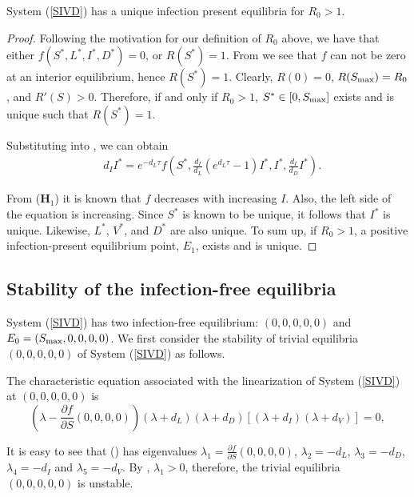 \documentclass{CMHPhD-SIVD}
\begin{document}
\begin{lemma}
	System (\ref{SIVD}) has a unique infection present equilibria for $R_0>1$.
\end{lemma}
\begin{proof}
Following the motivation for our definition of $R_0$ above, we have that
either $f(S^*, L^*, I^*, D^*)=0$, or $R(S^*)=1$.
From  we see that $f$ can not be zero at an interior equilibrium, hence
$R(S^*)=1$. 
Clearly, $R(0)=0$, $R(S_{\text{max}})=R_0$, and $R'(S)>0$. Therefore, if and only if $R_0>1$, $S^*\in[0, S_{\text{max}}]$ exists and is unique such that $R(S^*)=1$. 

Substituting  into , we can obtain
\begin{align*}
&d_I I^*=e^{-d_L\tau}f(S^*, \frac{d_I}{d_L}(e^{d_L\tau}-1)I^*, I^*, \frac{d_I}{d_D}I^*).
\end{align*}

From ($\mathbf{H}_1$) it is known that $f$ decreases with increasing $I$. Also, the left side of the equation is increasing. Since $S^*$ is known to be unique, it follows that $I^*$ is unique. Likewise, $L^*$, $V^*$, and $D^*$ are also unique. To sum up, if $R_0>1$, a positive infection-present equilibrium point, $E_1$, exists and is unique.
\end{proof}



\subsection{Stability of the infection-free equilibria}\label{sec3.2}
System (\ref{SIVD}) has two infection-free equilibrium: $(0,0,0,0,0)$ and $E_0=(S_{\text{max}},0,0,0,0)$.
We first consider the stability of trivial equilibria $(0,0,0,0,0)$ of System (\ref{SIVD}) as follows.

The characteristic equation associated with the linearization of System (\ref{SIVD}) at $(0, 0, 0,0, 0)$ is
\begin{equation}\label{c0}
    \left(\lambda-\frac{\partial f}{\partial S} (0, 0, 0, 0)\right)(\lambda+d_L)(\lambda+d_D)\left[(\lambda+d_I)(\lambda+d_V)\right]=0,
\end{equation}

It is easy to see that () has eigenvalues $\lambda_1=\frac{\partial f}{\partial S} (0, 0, 0, 0)$, $\lambda_2=-d_L$, $\lambda_3=-d_D$, $\lambda_4=-d_I$ and $\lambda_5=-d_V$. By , $\lambda_1 > 0$, therefore, the trivial equilibria $(0,0,0,0,0)$ is unstable.
\end{document}
